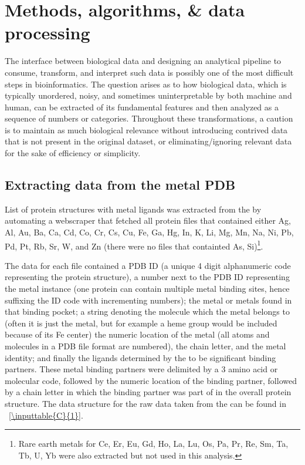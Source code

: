\documentclass[../main/main]{subfiles}
\begin{document}
\section{Methods, algorithms, \& data processing}
The interface between biological data and designing an analytical pipeline to consume, transform, and interpret such data is possibly one of the most difficult steps in bioinformatics. The question arises as to how biological data, which is typically unordered, noisy, and sometimes uninterpretable by both machine and human, can be extracted of its fundamental features and then analyzed as a sequence of numbers or categories. Throughout these transformations, a caution is to maintain as much biological relevance without introducing contrived data that is not present in the original dataset, or eliminating/ignoring relevant data for the sake of efficiency or simplicity.

\subsection{Extracting data from the metal PDB}
List of protein structures with metal ligands was extracted from the \mPDB{} by automating a webscraper that fetched all protein files that contained either Ag, Al, Au, Ba, Ca, Cd, Co, Cr, Cs, Cu, Fe, Ga, Hg, In, K, Li, Mg, Mn, Na, Ni, Pb, Pd, Pt, Rb, Sr, W, and Zn (there were no files that containted As, Si)\footnote{
	Rare earth metals for Ce, Er, Eu, Gd, Ho, La, Lu, Os, Pa, Pr, Re, Sm, Ta, Tb, U, Yb were also extracted but not used in this analysis.
}.

The data for each file contained a PDB ID (a unique 4 digit alphanumeric code representing the protein structure), a number next to the PDB ID representing the metal instance (one protein can contain multiple metal binding sites, hence suffixing the ID code with incrementing numbers);
the metal or metals found in that binding pocket;
a string denoting the molecule which the metal belongs to (often it is just the metal, but for example a heme group would be included because of its Fe center) the numeric location of the metal (all atoms and molecules in a PDB file format are numbered), the chain letter, and the metal identity;
and finally the ligands determined by the \mPDB{} to be significant binding partners. These metal binding partners were delimited by a 3 amino acid or molecular code, followed by the numeric location of the binding partner, followed by a chain letter in which the binding partner was part of in the overall protein structure. The data structure for the raw data taken from the \mPDB{} can be found in \TABLE~\ref{\inputtable{C}{1}}.
\end{document}
